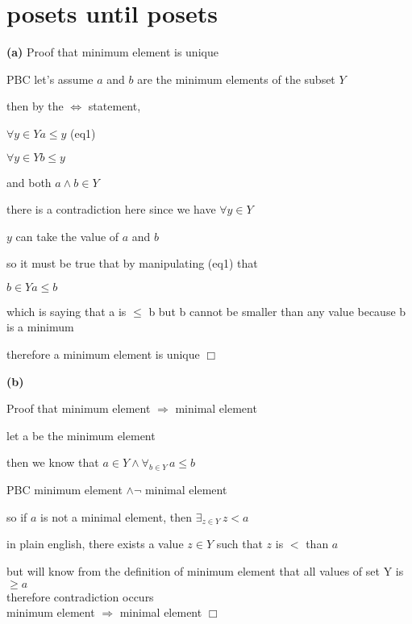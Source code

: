 \documentclass[12pts,A4]{article}
\begin{document}
\section{posets until posets}
\begin{flushleft}

        
    \textbf{(a)}
    Proof that minimum element is unique

    PBC let's assume $a$ and $b$ are the minimum elements of the subset $Y$

    then by the $\iff$ statement,
    
    $\forall y \in Y a \leq y $ (eq1) 

    $\forall y \in Y b \leq y $ 
    
    and both $ a \wedge b \in Y$

    there is a contradiction here since we have $\forall y \in Y$
    
    $y$ can take the value of $ a$ and $b$

    so it must be true that by manipulating (eq1) that
    
    $ b \in Y a \leq b $

    which is saying that a is $\leq$ b
    but b cannot be smaller than any value because b is a minimum 

    \bigskip

    therefore a minimum element is unique $\Box$
    
    \bigskip

    \textbf{(b)}

    Proof that  minimum element $\Rightarrow$   minimal element
    
    \bigskip

    let a be the minimum element 

    then we know that $ a \in Y \wedge \forall_{b \in Y} \, a \leq b $ 
   
    PBC minimum element $\wedge \neg$ minimal element

    so if $a$ is not a minimal element, then $\exists_{z \in Y} \, z < a$

    in plain english, there exists a value $z \in Y$ such that $z$ is $<$ than $a$

    but will know from the definition of minimum element that all values of set Y is $\geq a$\\
    therefore contradiction occurs\\ 
    \bigskip
    minimum element $\Rightarrow$ minimal element $\Box$
    

\end{flushleft}
\end{document}
